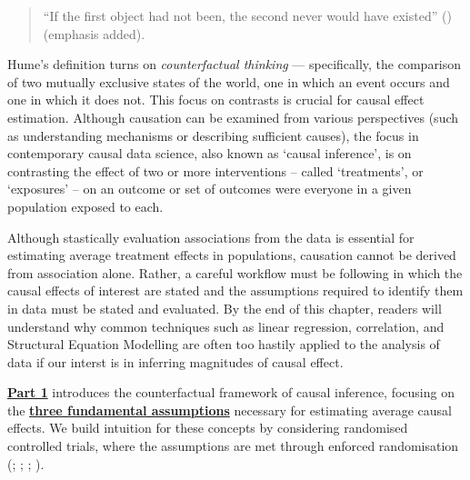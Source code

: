 \documentclass[
  singlecolumn]{article}
\begin{document}
\begin{quote}
``If the first object had not been, the second never would have
existed'' () (emphasis added).
\end{quote}

Hume's definition turns on \emph{counterfactual thinking} ---
specifically, the comparison of two mutually exclusive states of the
world, one in which an event occurs and one in which it does not. This
focus on contrasts is crucial for causal effect estimation. Although
causation can be examined from various perspectives (such as
understanding mechanisms or describing sufficient causes), the focus in
contemporary causal data science, also known as `causal inference', is
on contrasting the effect of two or more interventions -- called
`treatments', or `exposures' -- on an outcome or set of outcomes were
everyone in a given population exposed to each.

Although stastically evaluation associations from the data is essential
for estimating average treatment effects in populations, causation
cannot be derived from association alone. Rather, a careful workflow
must be following in which the causal effects of interest are stated and
the assumptions required to identify them in data must be stated and
evaluated. By the end of this chapter, readers will understand why
common techniques such as linear regression, correlation, and Structural
Equation Modelling are often too hastily applied to the analysis of data
if our interst is in inferring magnitudes of causal effect.

\hyperref[section-part1]{\textbf{Part 1}} introduces the counterfactual
framework of causal inference, focusing on the
\hyperref[sec-three-fundamental-assumptions]{\textbf{three fundamental
assumptions}} necessary for estimating average causal effects. We build
intuition for these concepts by considering randomised controlled
trials, where the assumptions are met through enforced randomisation
(;
;
;
).
\end{document}

